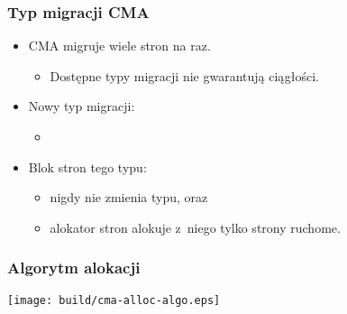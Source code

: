 \begin{frame}
  \frametitle{Typ migracji CMA}

  \begin{itemize}
  \item CMA migruje wiele stron na raz.
    \begin{itemize}
    \item Dostępne typy migracji nie gwarantują ciągłości.
    \end{itemize}
  \item Nowy typ migracji:
    \begin{itemize}
    \item {}
    \end{itemize}
  \item Blok stron tego typu:
    \begin{itemize}
    \item nigdy nie zmienia typu, oraz
    \item alokator stron alokuje z~niego tylko strony ruchome.
    \end{itemize}
  \end{itemize}
\end{frame}

\begin{frame}
  \frametitle{Algorytm alokacji}

  \begin{center}
    \texttt{[image: build/cma-alloc-algo.eps]}
  \end{center}

\end{frame}
